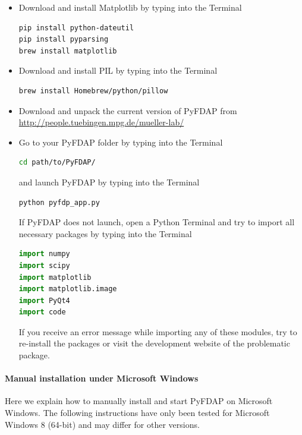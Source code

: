 \documentclass[a4paper,11pt]{article}
\begin{document}
\begin{itemize}
\item Download and install Matplotlib by typing into the Terminal
\begin{lstlisting}[frame=single,language=bash]  
pip install python-dateutil
pip install pyparsing 
brew install matplotlib
\end{lstlisting}
\item Download and install PIL by typing into the Terminal
\begin{lstlisting}[frame=single,language=bash]  
brew install Homebrew/python/pillow
\end{lstlisting}
\item  Download and unpack the current version of PyFDAP from \url{http://people.tuebingen.mpg.de/mueller-lab/}
\item Go to your PyFDAP folder by typing into the Terminal
\begin{lstlisting}[frame=single,language=bash]  
cd path/to/PyFDAP/
\end{lstlisting}
and launch PyFDAP by typing into the Terminal
\begin{lstlisting}[frame=single,language=bash]  
python pyfdp_app.py
\end{lstlisting}
If PyFDAP does not launch, open a Python Terminal and try to import all necessary packages by typing into the Terminal
\begin{lstlisting}[frame=single,language=Python]  
import numpy
import scipy
import matplotlib
import matplotlib.image
import PyQt4
import code
\end{lstlisting}
If you receive an error message while importing any of these modules, try to re-install the packages or visit the development website of the problematic
package.

\end{itemize}

\paragraph{Manual installation under Microsoft Windows}
Here we explain how to  manually  install and start PyFDAP on Microsoft Windows. The following instructions have only been tested for Microsoft Windows 8 (64-bit) and may differ for other versions.
\end{document}

